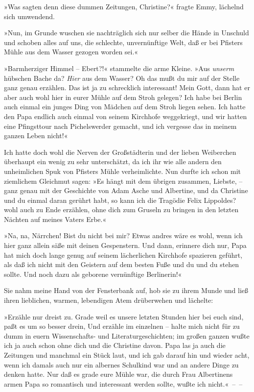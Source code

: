»Was sagten denn diese dummen Zeitungen, Christine?« fragte Emmy,
lächelnd sich umwendend.

»Nun, im Grunde wuschen sie nachträglich sich nur selber die Hände
in Unschuld und schoben alles auf uns, die schlechte, unvernünftige
Welt, daß er bei Pfisters Mühle aus dem Wasser gezogen worden
sei.«

»Barmherziger Himmel – Ebert?!« stammelte die arme Kleine. »Aus
\emph{unserm} hübschen Bache da? \emph{Hier} aus dem Wasser? Oh das
mußt du mir auf der Stelle ganz genau erzählen. Das ist ja zu
schrecklich interessant! Mein Gott, dann hat er aber auch wohl hier
in eurer Mühle auf dem Stroh gelegen? Ich habe bei Berlin auch
einmal ein junges Ding von Mädchen auf dem Stroh liegen sehen. Ich
hatte den Papa endlich auch einmal von seinem Kirchhofe
weggekriegt, und wir hatten eine Pfingsttour nach Pichelswerder
gemacht, und ich vergesse das in meinem ganzen Leben nicht!«

Ich hatte doch wohl die Nerven der Großstädterin und der lieben
Weiberchen überhaupt ein wenig zu sehr unterschätzt, da ich ihr wie
alle andern den unheimlichen Spuk von Pfisters Mühle verheimlichte.
Nun durfte ich schon mit ziemlichem Gleichmut sagen: »Es hängt mit
dem übrigen zusammen, Liebste, – ganz genau mit der Geschichte von
Adam Asche und Albertine, und da Christine und du einmal daran
gerührt habt, so kann ich die Tragödie Felix Lippoldes? wohl auch
zu Ende erzählen, ohne dich zum Gruseln zu bringen in den letzten
Nächten auf meines Vaters Erbe.«

»Na, na, Närrchen! Bist du nicht bei mir? Etwas andres wäre es
wohl, wenn ich hier ganz allein säße mit deinen Gespenstern. Und
dann, erinnere dich nur, Papa hat mich doch lange genug auf seinem
lächerlichen Kirchhofe spazieren geführt, als daß ich nicht mit den
Geistern auf dem besten Fuße und du und du stehen sollte. Und noch
dazu als geborene vernünftige Berlinerin!«

Sie nahm meine Hand von der Fensterbank auf, hob sie zu ihrem Munde
und ließ ihren lieblichen, warmen, lebendigen Atem drüberwehen und
lächelte:

»Erzähle nur dreist zu. Grade weil es unsere letzten Stunden hier
bei euch sind, paßt es um so besser drein, Und erzähle im einzelnen
– halte mich nicht für zu dumm in euern Wissenschafts- und
Literaturgeschichten; im großen ganzen wußte ich ja auch schon ohne
dich und die Christine davon. Papa las ja auch die Zeitungen und
manchmal ein Stück laut, und ich gab darauf hin und wieder acht,
wenn ich damals auch nur ein albernes Schulkind war und an andere
Dinge zu denken hatte. Nur daß es grade eure Mühle war, die durch
Frau Albertinens armen Papa so romantisch und interessant werden
sollte, wußte ich nicht.«~–~–

